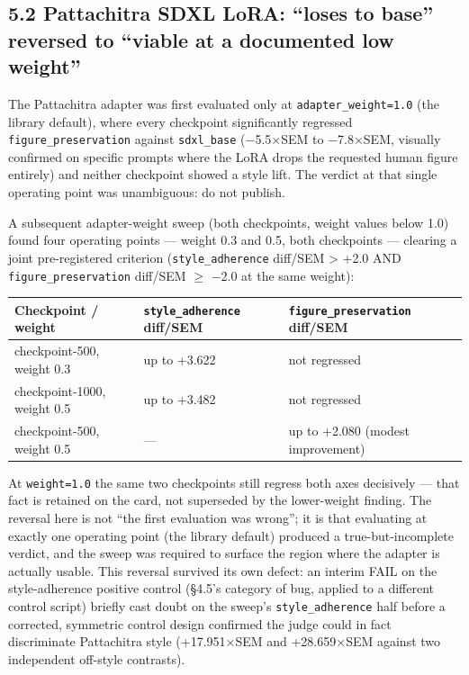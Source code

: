 \hypertarget{pattachitra-sdxl-lora-loses-to-base-reversed-to-viable-at-a-documented-low-weight}{%
\subsection{5.2 Pattachitra SDXL LoRA: ``loses to base'' reversed to
``viable at a documented low
weight''}\label{pattachitra-sdxl-lora-loses-to-base-reversed-to-viable-at-a-documented-low-weight}}

The Pattachitra adapter was first evaluated only at
\texttt{adapter\_weight=1.0} (the library default), where every
checkpoint significantly regressed \texttt{figure\_preservation} against
\texttt{sdxl\_base} (−5.5×SEM to −7.8×SEM, visually confirmed on
specific prompts where the LoRA drops the requested human figure
entirely) and neither checkpoint showed a style lift. The verdict at
that single operating point was unambiguous: do not publish.

A subsequent adapter-weight sweep (both checkpoints, weight values below
1.0) found four operating points --- weight 0.3 and 0.5, both
checkpoints --- clearing a joint pre-registered criterion
(\texttt{style\_adherence} diff/SEM \textgreater{} +2.0 AND
\texttt{figure\_preservation} diff/SEM $\geq$ −2.0 at the same weight):

\begin{longtable}[]{@{}lll@{}}
\toprule
Checkpoint / weight & \texttt{style\_adherence} diff/SEM &
\texttt{figure\_preservation} diff/SEM \\
\midrule
\endhead
checkpoint-500, weight 0.3 & up to +3.622 & not regressed \\
checkpoint-1000, weight 0.5 & up to +3.482 & not regressed \\
checkpoint-500, weight 0.5 & --- & up to +2.080 (modest improvement) \\
\bottomrule
\end{longtable}

At \texttt{weight=1.0} the same two checkpoints still regress both axes
decisively --- that fact is retained on the card, not superseded by the
lower-weight finding. The reversal here is not ``the first evaluation
was wrong''; it is that evaluating at exactly one operating point (the
library default) produced a true-but-incomplete verdict, and the sweep
was required to surface the region where the adapter is actually usable.
This reversal survived its own defect: an interim FAIL on the
style-adherence positive control (§4.5's category of bug, applied to a
different control script) briefly cast doubt on the sweep's
\texttt{style\_adherence} half before a corrected, symmetric control
design confirmed the judge could in fact discriminate Pattachitra style
(+17.951×SEM and +28.659×SEM against two independent off-style
contrasts).

